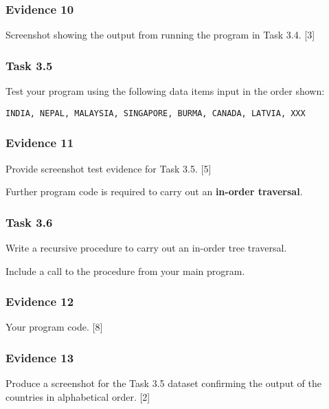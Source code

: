 \subsubsection*{Evidence 10}

Screenshot showing the output from running the program in Task 3.4.\hfill{}
{[}3{]}

\subsubsection*{Task 3.5}

Test your program using the following data items input in the order
shown:
\begin{center}
\texttt{INDIA, NEPAL, MALAYSIA, SINGAPORE, BURMA, CANADA, LATVIA,
XXX}
\par\end{center}

\subsubsection*{Evidence 11}

Provide screenshot test evidence for Task 3.5. \hfill{}{[}5{]}

Further program code is required to carry out an \textbf{in-order
traversal}.

\subsubsection*{Task 3.6}

Write a recursive procedure to carry out an in-order tree traversal. 

Include a call to the procedure from your main program.

\subsubsection*{Evidence 12}

Your program code. \hfill{}{[}8{]}

\subsubsection*{Evidence 13}

Produce a screenshot for the Task 3.5 dataset confirming the output
of the countries in alphabetical order. \hfill{}{[}2{]}